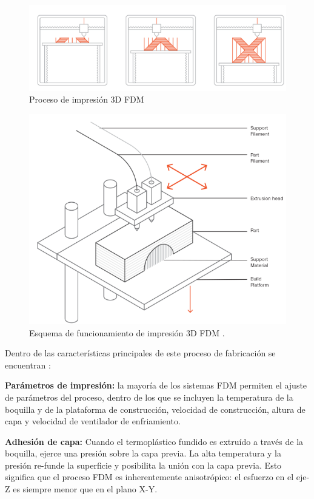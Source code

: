 \begin{figure}[h]
\centering
\includegraphics[scale=0.8]{images/fdmprocess.png}
\caption{Proceso de impresión 3D FDM \parencite{bournias2017} }
\end{figure}

\begin{figure}[H]
\centering
\includegraphics[scale=0.6]{images/fdmesquema.png}
\caption{Esquema de funcionamiento de impresión 3D FDM \parencite{bournias2017}.}
\end{figure}
\pagebreak

Dentro de las características principales de este proceso de fabricación se encuentran \parencite{bournias2017}:

\begin{description}
\item \textbf{Parámetros de impresión:} la mayoría de los sistemas FDM permiten el ajuste de parámetros del proceso, dentro de los que se incluyen la temperatura de la boquilla y de la plataforma de construcción, velocidad de construcción, altura de capa y velocidad de ventilador de enfriamiento.
\end{description}
\begin{description}
\item \textbf{Adhesión de capa:} Cuando el termoplástico fundido es extruído a través de la boquilla, ejerce una presión sobre la capa previa. La alta temperatura y la presión re-funde la superficie y posibilita la unión con la capa previa. Esto significa que el proceso FDM es inherentemente anisotrópico: el esfuerzo en el eje-Z es siempre menor que en el plano X-Y.
\end{description}

